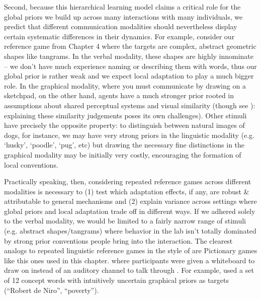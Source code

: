 Second, because this hierarchical learning model claims a critical role for the global priors we build up across many interactions with many individuals, we predict that different communication modalities should nevertheless display certain systematic differences in their dynamics.
For example, consider our reference game from Chapter 4 where the targets are complex, abstract geometric shapes like tangrams.
In the verbal modality, these shapes are highly innominate -- we don't have much experience naming or describing them with words, thus our global prior is rather weak and we expect local adaptation to play a much bigger role.
In the graphical modality, where you must communicate by drawing on a sketchpad, on the other hand, agents have a much stronger prior rooted in assumptions about shared perceptual systems and visual similarity (though see ): explaining these similarity judgements poses its own challenges).
Other stimuli have precisely the opposite property: to distinguish between natural images of dogs, for instance, we may have very strong priors in the linguistic modality (e.g. `husky', `poodle', `pug', etc) but drawing the necessary fine distinctions in the graphical modality may be initially very costly, encouraging the formation of local conventions. 

Practically speaking, then, considering repeated reference games across different modalities is necessary to (1) test which adaptation effects, if any, are robust \& attributable to general mechanisms and (2) explain variance across settings where global priors and local adaptation trade off in different ways.
If we adhered solely to the verbal modality, we would be limited to a fairly narrow range of stimuli (e.g. abstract shapes/tangrams) where behavior in the lab isn't totally dominated by strong prior conventions people bring into the interaction. 
The clearest analogs to repeated linguistic reference games in the style of \cite{KraussWeinheimer64_ReferencePhrases} are Pictionary games like this ones used in this chapter.
where participants were given a whiteboard to draw on instead of an auditory channel to talk through \cite{TheisenEtAl10_SystematicityArbitrariness}.
For example,  used a set of 12 concept words with intuitively uncertain graphical priors as targets (``Robert de Niro'', ``poverty'').

